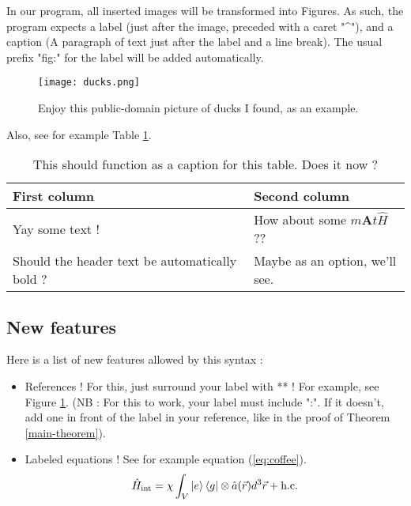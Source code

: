 \documentclass{article}
\begin{document}
\begin{maincontent}
In our program, all inserted images will be transformed into Figures. As such, the program expects a label (just after the image, preceded with a caret "\^{}"), and a caption (A paragraph of text just after the label and a line break). The usual prefix "fig:" for the label will be added automatically.


\begin{figure}
    \centering
    \texttt{[image: ducks.png]}
    \caption{Enjoy this public-domain picture of ducks I found, as an example.}
    \label{fig:ducks}
\end{figure}
        

Also, see for example Table \ref{tab:cool-table}.

\begin{table}
    \centering
    \begin{tabular}{l|l}
First column & Second column \\
\hline
Yay some text ! & How about some $m\mathbf{A}t\hat{H}$ ?? \\
Should the header text be automatically bold ? & Maybe as an option, we'll see. \\

\end{tabular}

    \caption{This should function as a caption for this table. Does it now ?}
    \label{tab:cool-table}
\end{table}
        
\subsection{New features}

Here is a list of new features allowed by this syntax :
\begin{itemize}
\item 
References ! For this, just surround your label with ** ! For example, see Figure \ref{fig:ducks}. (NB : For this to work, your label must include ":". If it doesn't, add one in front of the label in your reference, like in the proof of Theorem \ref{main-theorem}).

\item 
Labeled equations ! See for example equation (\ref{eq:coffee}).\begin{equation}
	\hat{H}_{\text{int}}=\chi\int _{V}\ket{e} \bra{g} \otimes \hat{a}(\vec{r})d^{3}\vec{r}+\text{h.c.}
\label{eq:coffee}\end{equation}



\end{itemize}
\end{maincontent}
\end{document}

